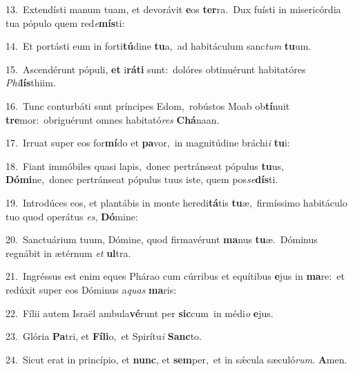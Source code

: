 {\numbfont\textcolor{\numbcolor}{13.}}~Extendísti manum tuam, et devorávit \textbf{e}\-os \textbf{ter}\-ra.~\star Dux fuísti in misericórdia tua pópulo quem red\-\textit{e}\-\textbf{mís}ti:\par
{\numbfont\textcolor{\numbcolor}{14.}}~Et portásti eum in forti\-\textbf{tú}\-dine \textbf{tu}\-a,~\star ad habitáculum sanc\textit{tum} \textbf{tu}\-um.\par
{\numbfont\textcolor{\numbcolor}{15.}}~Ascendérunt pópuli, \textbf{et} i\-\textbf{rá}\-\textbf{ti} sunt:~\star dolóres obtinuérunt habitatóres \textit{Phi}\-\textbf{lís}thiim.\par
{\numbfont\textcolor{\numbcolor}{16.}}~Tunc conturbáti sunt príncipes Edom,~\dagger robústos Moab ob\-\textbf{tí}\-nuit \textbf{tre}\-mor:~\star obriguérunt omnes habitató\textit{res} \textbf{Chá}\-naan.\par
{\numbfont\textcolor{\numbcolor}{17.}}~Irruat super eos for\-\textbf{mí}\-do et \textbf{pa}\-vor,~\star in magnitúdine bráchi\textit{i} \textbf{tu}\-i:\par
{\numbfont\textcolor{\numbcolor}{18.}}~Fiant immóbiles quasi lapis,~\dagger donec pertránseat pópulus \textbf{tu}\-us, \textbf{Dó}\-\textbf{mi}ne,~\star donec pertránseat pópulus tuus iste, quem pos\-\textit{se}\-\textbf{dís}ti.\par
{\numbfont\textcolor{\numbcolor}{19.}}~Introdúces eos, et plantábis in monte heredi\-\textbf{tá}\-tis \textbf{tu}\-æ,~\star firmíssimo habitáculo tuo quod operátus \textit{es}\-, \textbf{Dó}\-mine:\par
{\numbfont\textcolor{\numbcolor}{20.}}~Sanctuárium tuum, Dómine, quod firmavérunt \textbf{ma}\-nus \textbf{tu}\-æ.~\star Dóminus regnábit in ætérnum \textit{et} \textbf{ul}\-tra.\par
{\numbfont\textcolor{\numbcolor}{21.}}~Ingréssus est enim eques Phárao cum cúrribus et equítibus \textbf{e}\-jus in \textbf{ma}\-re:~\star et redúxit super eos Dóminus a\textit{quas} \textbf{ma}\-ris:\par
{\numbfont\textcolor{\numbcolor}{22.}}~Fílii autem Israël ambula\-\textbf{vé}\-runt per \textbf{sic}\-cum~\star in médi\textit{o} \textbf{e}\-jus.\par
{\numbfont\textcolor{\numbcolor}{23.}}~Glória \textbf{Pa}\-tri, et \textbf{Fí}\-\textbf{li}o,~\star et Spirítu\textit{i} \textbf{Sanc}\-to.\par
{\numbfont\textcolor{\numbcolor}{24.}}~Sicut erat in princípio, et \textbf{nunc}\-, et \textbf{sem}\-per,~\star et in sǽcula sæculó\-\textit{rum}\-. \textbf{A}\-men.\par
